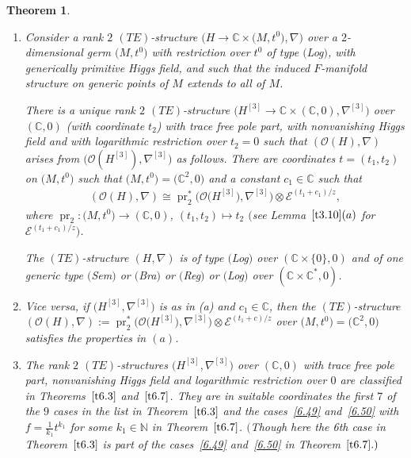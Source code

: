\documentclass[10pt,a4paper]{amsart}
\numberwithin{equation}{section}
\numberwithin{figure}{section}
\newcommand{\N}{{\mathbb N}}
\newcommand{\C}{{\mathbb C}}
\newcommand{\EE}{{\mathcal E}}
\newcommand{\OO}{{\mathcal O}}
\newcommand{\nnn}{\nabla}
\DeclareMathOperator{\pr}{pr}
\newtheorem{Theorem}{Theorem}[section]
\begin{document}
\begin{Theorem}\label{t8.1}\quad
\begin{enumerate}\itemsep=0pt
\item[$(a)$]
Consider a rank $2$ $(TE)$-structure $\big(H\to\C\times \big(M,t^0\big),\nnn\big)$
over a $2$-dimen\-sio\-nal germ $\big(M,t^0\big)$
with restriction over $t^0$ of type $($Log$)$,
with generically primitive Higgs field,
and such that the induced $F$-manifold structure on generic
points of $M$ extends to all of $M$.

There is a unique rank $2$ $(TE)$-structure
$\big(H^{[3]}\to\C\times(\C,0),\nnn^{[3]}\big)$ over $(\C,0)$
(with coordinate $t_2$) with trace free pole part,
with nonvanishing Higgs field
and with logarithmic restriction over $t_2=0$ such that
$(\OO(H),\nnn)$ arises from $\big(\OO(H^{[3]}),\nnn^{[3]}\big)$
as follows. There are coordinates $t=(t_1,t_2)$
on $\big(M,t^0\big)$ such that $\big(M,t^0\big)=\big(\C^2,0\big)$
and a constant $c_1\in\C$ such that
\begin{gather}\label{8.1}
(\OO(H),\nnn)\cong\pr_2^*\big(\OO\big(H^{[3]}\big),\nnn^{[3]}\big)\otimes
\EE^{(t_1+c_1)/z},
\end{gather}
where $\pr_2\colon \big(M,t^0\big)\to(\C,0)$, $(t_1,t_2)\mapsto t_2$
$\big($see Lemma~$\ref{t3.10}(a)$ for $\EE^{(t_1+c_1)/z}\big)$.

The $(TE)$-structure $(H,\nnn)$ is of type $($Log$)$
over $(\C\times\{0\},0)$ and of one generic type
$($Sem$)$ or $($Bra$)$ or $($Reg$)$ or $($Log$)$ over $(\C\times\C^*,0)$.

\item[$(b)$] Vice versa, if $\big(H^{[3]},\nnn^{[3]}\big)$ is as in (a)
and $c_1\in\C$, then the $(TE)$-structure
$(\OO(H),\nnn):=\pr_2^*\big(\OO\big(H^{[3]}\big),\nnn^{[3]}\big)\otimes
\EE^{(t_1+c)/z}$ over $\big(M,t^0\big)=\big(\C^2,0\big)$ satisfies
the properties in $(a)$.

\item[$(c)$] The rank $2$ $(TE)$-structures $\big(H^{[3]},\nnn^{[3]}\big)$
over $(\C,0)$ with trace free pole part, nonvanishing Higgs field
and logarithmic restriction over $0$
are classified in Theorems~$\ref{t6.3}$ and~$\ref{t6.7}$.
They are in suitable coordinates the first $7$ of the $9$
cases in the list in Theorem~$\ref{t6.3}$
and the cases~\eqref{6.49} and~\eqref{6.50}
with $f=\frac{1}{k_1}t^{k_1}$ for some $k_1\in\N$
in Theorem~$\ref{t6.7}$. $($Though here the 6th case
in Theorem~$\ref{t6.3}$ is part of the cases~\eqref{6.49}
and~\eqref{6.50} in Theorem~$\ref{t6.7}.)$


\end{enumerate}
\end{Theorem}
\end{document}
